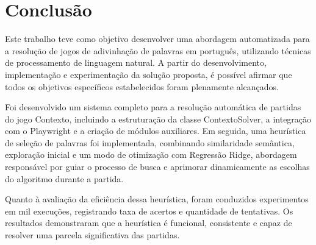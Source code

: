 \chapter{Conclusão}
Este trabalho teve como objetivo desenvolver uma abordagem automatizada para a resolução de jogos de adivinhação de palavras em português, utilizando técnicas de processamento de linguagem natural. A partir do desenvolvimento, implementação e experimentação da solução proposta, é possível afirmar que todos os objetivos específicos estabelecidos foram plenamente alcançados.




Foi desenvolvido um sistema completo para a resolução automática de partidas do jogo Contexto, incluindo a estruturação da classe ContextoSolver, a integração com o Playwright e a criação de módulos auxiliares. Em seguida, uma heurística de seleção de palavras foi implementada, combinando similaridade semântica, exploração inicial e um modo de otimização com Regressão Ridge, abordagem responsável por guiar o processo de busca e aprimorar dinamicamente as escolhas do algoritmo durante a partida.

Quanto à avaliação da eficiência dessa heurística, foram conduzidos experimentos em mil execuções, registrando taxa de acertos e quantidade de tentativas. Os resultados demonstraram que a heurística é funcional, consistente e capaz de resolver uma parcela significativa das partidas.

